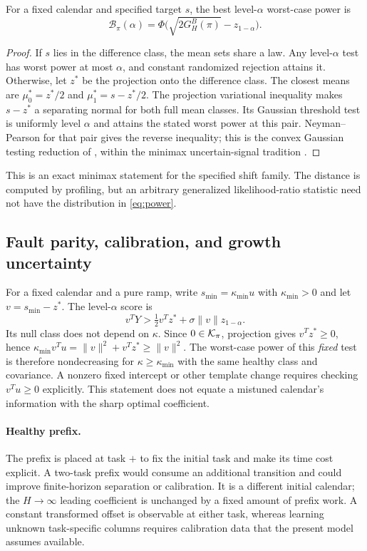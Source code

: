 \begin{proposition}\label{prop:testing}
For a fixed calendar and specified target $s$, the best level-$\alpha$ worst-case power is
\begin{equation}
 \mathcal B_\pi(\alpha)=\Phi\bigl(\sqrt{2G_H^B(\pi)}-z_{1-\alpha}\bigr).\label{eq:power}
\end{equation}
\end{proposition}
\begin{proof}
If $s$ lies in the difference class, the mean sets share a law. Any level-$\alpha$ test has worst power at most $\alpha$, and constant randomized rejection attains it. Otherwise, let $z^*$ be the projection onto the difference class. The closest means are $\mu_0^*=z^*/2$ and $\mu_1^*=s-z^*/2$. The projection variational inequality makes $s-z^*$ a separating normal for both full mean classes. Its Gaussian threshold test is uniformly level $\alpha$ and attains the stated worst power at this pair. Neyman--Pearson for that pair gives the reverse inequality; this is the convex Gaussian testing reduction of \cite{gjn}, within the minimax uncertain-signal tradition \cite{burnashev}.\end{proof}
This is an exact minimax statement for the specified shift family. The distance is computed by profiling, but an arbitrary generalized likelihood-ratio statistic need not have the distribution in \eqref{eq:power}.

\subsection{Fault parity, calibration, and growth uncertainty}
For a fixed calendar and a pure ramp, write $s_{\min}=\kappa_{\min}u$ with $\kappa_{\min}>0$ and let $v=s_{\min}-z^*$. The level-$\alpha$ score is
\begin{equation}
 v^TY>\tfrac12v^Tz^*+\sigma\|v\|z_{1-\alpha}.
 \label{eq:implement_test}
\end{equation}
Its null class does not depend on $\kappa$. Since $0\in\mathcal K_\pi$, projection gives $v^Tz^*\ge0$, hence
$\kappa_{\min}v^Tu=\|v\|^2+v^Tz^*\ge\|v\|^2$.
The worst-case power of this \emph{fixed} test is therefore nondecreasing for $\kappa\ge\kappa_{\min}$ with the same healthy class and covariance. A nonzero fixed intercept or other template change requires checking $v^Tu\ge0$ explicitly. This statement does not equate a mistuned calendar's information with the sharp optimal coefficient.

\paragraph{Healthy prefix.}
The prefix is placed at task $+$ to fix the initial task and make its time cost explicit. A two-task prefix would consume an additional transition and could improve finite-horizon separation or calibration. It is a different initial calendar; the $H\to\infty$ leading coefficient is unchanged by a fixed amount of prefix work. A constant transformed offset is observable at either task, whereas learning unknown task-specific columns requires calibration data that the present model assumes available.
